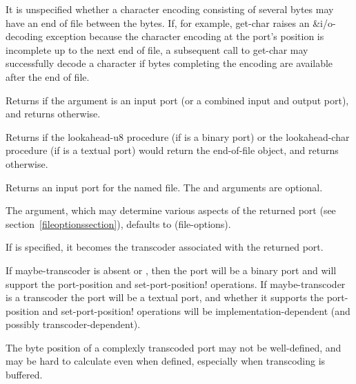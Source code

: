 It is unspecified whether a character encoding consisting of several
bytes may have an end of file between the bytes.  If, for example,
{\cf get-char} raises an {\cf\&i/o-decoding} exception because the
character encoding at the port's position is incomplete up to the next
end of file, a subsequent call to {\cf get-char} may successfully
decode a character if bytes completing the encoding are available
after the end of file.

\begin{entry}{%
}

Returns \schtrue{} if the argument is an input port (or a combined input
and output port), and returns \schfalse{} otherwise.
\end{entry}

\begin{entry}{%
}
   
Returns \schtrue{}
if the {\cf lookahead-u8} procedure (if  is a binary port)
or the {\cf lookahead-char} procedure (if  is a textual port)
would return
the end-of-file object, and returns \schfalse{} otherwise.
\end{entry}

\begin{entry}{%
}
   

Returns an input port for the named file. The  and
 arguments are optional.

The  argument, which may determine
various aspects of the returned port (see section~\ref{fileoptionssection}),
defaults to {\cf (file-options)}.

If  is specified, it becomes the transcoder associated
with the returned port.

If {\cf maybe-transcoder} is absent or \schfalse{}, then the port will be a
binary port and will support the {\cf port-position} and {\cf
  set-port-position!}  operations.  If {\cf maybe-transcoder} is a
transcoder the port will be a textual port, and whether it supports
the {\cf port-position} and {\cf set-port-position!} operations will
be implementation-dependent (and possibly transcoder-dependent).

\begin{rationale}
  The byte position of a complexly transcoded port may not be
  well-defined, and may be hard to calculate even when defined,
  especially when transcoding is buffered.
\end{rationale}
\end{entry}

